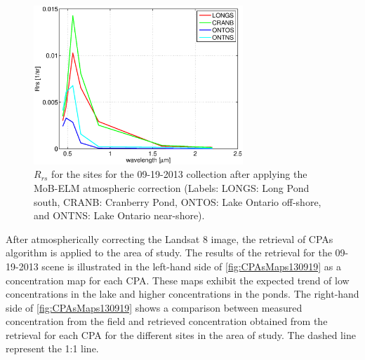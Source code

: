 \documentclass[onecolumn,3p,letterpaper]{elsarticle}
\begin{document}
\begin{figure}[htbp!]
  \centering
  \includegraphics[height=6cm]{./Images/ROI130919_150422}
  \caption{$R_{rs}$ for the sites for the 09-19-2013 collection after applying the MoB-ELM atmospheric correction (Labels: LONGS: Long Pond south, CRANB: Cranberry Pond, ONTOS: Lake Ontario off-shore, and ONTNS: Lake Ontario near-shore).\label{fig:RrsROIs130919} } 
\end{figure}

After atmospherically correcting the Landsat 8 image, the retrieval of CPAs algorithm is applied to the area of study. The results of the retrieval for the 09-19-2013 scene is illustrated in the left-hand side of \autoref{fig:CPAsMaps130919} as a concentration map for each CPA. These maps exhibit the expected trend of low concentrations in the lake and higher concentrations in the ponds. The right-hand side of \autoref{fig:CPAsMaps130919} shows a comparison between measured concentration from the field and retrieved concentration obtained from the retrieval for each CPA for the different sites in the area of study. The dashed line represent the 1:1 line. 
\end{document}
